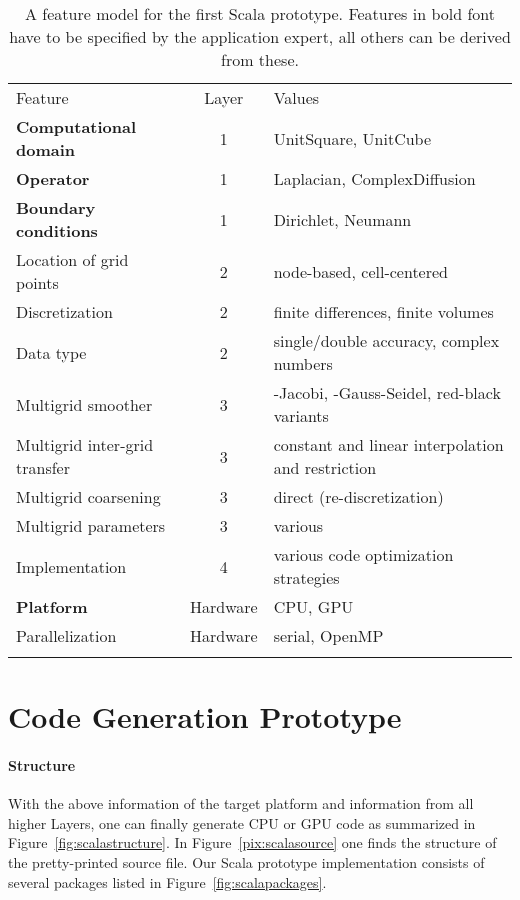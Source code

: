 \documentclass[onecolumn]{svjour3}
\begin{document}
 \begin{table}
\centering
\caption{\label{tab:generator} A feature model for the first Scala prototype. Features in bold font have to be specified by the application expert, all others can be derived from these. } \begin{tabular}{lcl}
\toprule\noalign{\smallskip}
 Feature & Layer & Values   \\   
\noalign{\smallskip}\midrule\noalign{\smallskip}
\textbf{Computational domain} & 1 &  UnitSquare, UnitCube  \\
\textbf{Operator} & 1 &  Laplacian, ComplexDiffusion \\
\textbf{Boundary conditions} & 1 &  Dirichlet, Neumann  \\
Location of grid points & 2 &  node-based, cell-centered  \\
Discretization & 2 &  finite differences, finite volumes  \\
Data type & 2 &  single/double accuracy, complex numbers  \\
Multigrid smoother & 3 &  -Jacobi, -Gauss-Seidel, red-black variants  \\
Multigrid inter-grid transfer & 3 &  constant and linear interpolation and restriction  \\
Multigrid coarsening & 3 &  direct (re-discretization)  \\
Multigrid parameters & 3 &  various  \\
Implementation & 4 &  various code optimization strategies \\ \textbf{Platform} & Hardware &  CPU, GPU  \\
Parallelization & Hardware &  serial, OpenMP \\
\noalign{\smallskip}\bottomrule
\end{tabular} 
\end{table}


\section{Code Generation Prototype \label{sec:scala}}

\paragraph{Structure}

With the above information of the target platform and information from all higher Layers, one can finally generate CPU or GPU code as summarized in Figure~\ref{fig:scalastructure}. 
In Figure~\ref{pix:scalasource} one finds the structure of the pretty-printed source file.
Our Scala prototype implementation consists of several packages listed in Figure~\ref{fig:scalapackages}.
\end{document}
